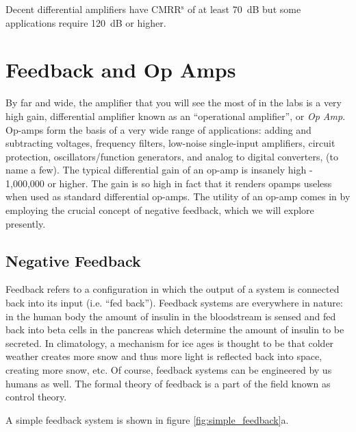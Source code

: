 \documentclass{tufte-book}
\begin{document}
Decent differential amplifiers have CMRR$^\text{s}$ of at least 70~dB but some applications require 120~dB or higher.



\chapter{Feedback and Op Amps}
By far and wide, the amplifier that you will see the most of in the labs is a very high gain, differential amplifier known as an ``operational amplifier'', or \textit{Op Amp}. Op-amps form the basis of a very wide range of applications: adding and subtracting voltages, frequency filters, low-noise single-input amplifiers, circuit protection, oscillators/function generators, and analog to digital converters, (to name a few). The typical differential gain of an op-amp is insanely high - 1,000,000 or higher. The gain is so high in fact that it renders opamps useless when used as standard differential op-amps. The utility of an op-amp comes in by employing the crucial concept of negative feedback, which we will explore presently.

\section{Negative Feedback}
Feedback refers to a configuration in which the output of a system is connected back into its input (i.e. ``fed back''). Feedback systems are everywhere in nature: in the human body the amount of insulin in the bloodstream is sensed and fed back into beta cells in the pancreas which determine the amount of insulin to be secreted. In climatology, a mechanism for ice ages is thought to be that colder weather creates more snow and thus more light is reflected back into space, creating more snow, etc. Of course, feedback systems can be engineered by us humans as well. The formal theory of feedback is a part of the field known as control theory.

A simple feedback system is shown in figure \ref{fig:simple_feedback}a.
\end{document}
